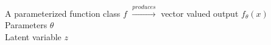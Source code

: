 \documentclass[preview]{standalone}
\begin{document}
A parameterized function class $f$ $\xrightarrow{produces}$ vector valued output $f_\theta(x)$\\Parameters $\theta$\\Latent variable $z$\\
\end{document}
